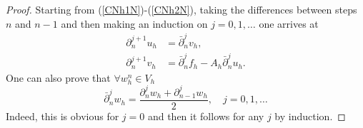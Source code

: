 \documentclass{imanum}
\begin{document}
\begin{proof}
Starting from (\ref{CNh1N})-(\ref{CNh2N}), taking the differences between steps $n$ and $n - 1$
and then making an induction on $j = 0, 1, \ldots$ one arrives at
\begin{align}
   \label{CNh1NN}
   {\partial}^{j+1}_{n} u_h &= \bar{\partial}^j_n {v}_h, \\
   \label{CNh2NN}
    {\partial}^{j+1}_{n} v_h  &=   \bar{\partial}^j_n {f}_h - A_h \bar{\partial}^j_n {u}_h. 
\end{align}
One can also prove that  $\forall w^n_h\in V_h$ 
\begin{equation}\label{propj}
 \bar{\partial}^j_n {w}_h = \frac{{\partial}^j_n w_h +
   {\partial}^j_{n - 1} w_h}{2}, \hspace{1em} j = 0, 1, \ldots
\end{equation}
Indeed, this is obvious for $j = 0$ and then it follows for any $j$ by induction.


\end{proof}
\end{document}
